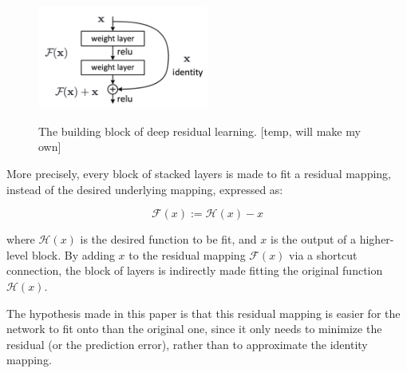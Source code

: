 \begin{figure}[h]
	\center
	\includegraphics[width=0.5\textwidth]{figure/resblock.png}
	\label{fig:resblock}
	\caption{The building block of deep residual learning. [temp, will make my
	own]}
\end{figure}

More precisely, every block of stacked layers is made to fit a residual
mapping, instead of the desired underlying mapping, expressed as:

\begin{equation}
	\mathcal{F}(x):=\mathcal{H}(x)-x
\end{equation}

where $\mathcal{H}(x)$ is the desired function to be fit, and $x$ is the output of a
higher-level block. By adding $x$ to the residual mapping $\mathcal{F}(x)$ via a shortcut
connection, the block of layers is indirectly made fitting the original
function $\mathcal{H}(x)$.

The hypothesis made in this paper is that this residual
mapping is easier for the network to fit onto than the original one, since it
only needs to minimize the residual (or the prediction error), rather than to
approximate the identity mapping.
